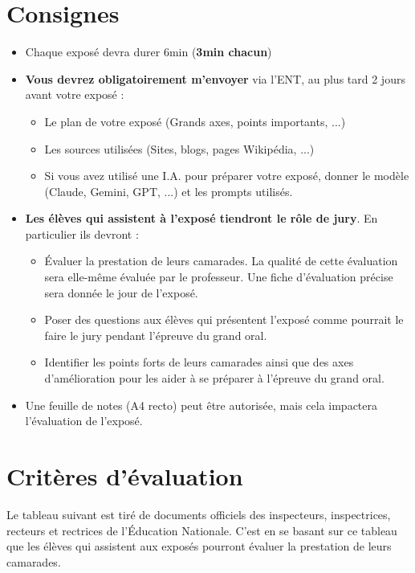\documentclass[oneside,12pt]{article}          %
\begin{document}
\section{Consignes}
\begin{itemize}[label=$\bullet$ , itemsep = 0pt]
	\item Chaque exposé devra durer 6min (\textbf{3min chacun})
	\item \textbf{Vous devrez obligatoirement m'envoyer} via l'ENT, au plus tard 2 jours avant votre exposé :
	\begin{itemize}
		\item Le plan de votre exposé (Grands axes, points importants, ...)
		\item Les sources utilisées (Sites, blogs, pages Wikipédia, ...)
		\item Si vous avez utilisé une I.A. pour préparer votre exposé, donner le modèle (Claude, Gemini, GPT, ...) et les prompts utilisés.
	\end{itemize}
	\item \textbf{Les élèves qui assistent à l'exposé tiendront le rôle de jury}. En particulier ils devront :
	\begin{itemize}
		\item Évaluer la prestation de leurs camarades. La qualité de cette évaluation sera elle-même évaluée par le professeur. Une fiche d'évaluation précise sera donnée le jour de l'exposé.
		\item Poser des questions aux élèves qui présentent l'exposé comme pourrait le faire le jury pendant l'épreuve du grand oral.
		\item Identifier les points forts de leurs camarades ainsi que des axes d'amélioration pour les aider à se préparer à l'épreuve du grand oral.
	\end{itemize}
	\item Une feuille de notes (A4 recto) peut être autorisée, mais cela impactera l'évaluation de l'exposé.
\end{itemize}



\section{Critères d'évaluation}
Le tableau suivant est tiré de documents officiels des inspecteurs, inspectrices, recteurs et rectrices de l'Éducation Nationale. C'est en se basant sur ce tableau que les élèves qui assistent aux exposés pourront évaluer la prestation de leurs camarades.
\end{document}
